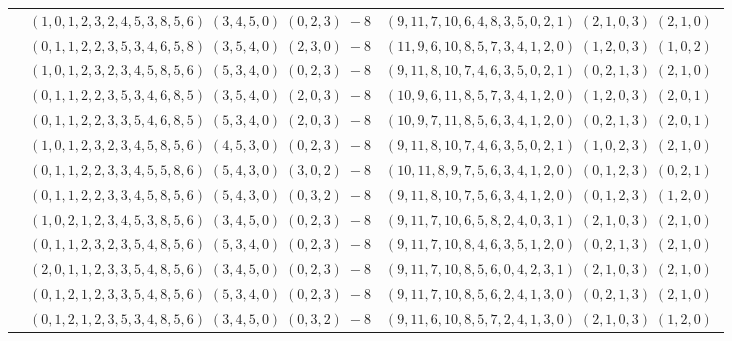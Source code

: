 \documentclass[11pt]{article}
\begin{document}
\begin{longtable}[l]{|c|c|c|}
 \cline{2-3} 
 & $(1 ,0 ,1 ,2 ,3 ,2 ,4 ,5 ,3 ,8 ,5 ,6) \;(3 ,4 ,5 ,0) \;(0 ,2 ,3) \;-8$ & $(9 ,11 ,7 ,10 ,6 ,4 ,8 ,3 ,5 ,0 ,2 ,1) \;(2 ,1 ,0 ,3) \;(2 ,1 ,0) \;$\\ 
 \cline{2-3} 
 & $(0 ,1 ,1 ,2 ,2 ,3 ,5 ,3 ,4 ,6 ,5 ,8) \;(3 ,5 ,4 ,0) \;(2 ,3 ,0) \;-8$ & $(11 ,9 ,6 ,10 ,8 ,5 ,7 ,3 ,4 ,1 ,2 ,0) \;(1 ,2 ,0 ,3) \;(1 ,0 ,2) \;$\\ 
 \cline{2-3} 
 & $(1 ,0 ,1 ,2 ,3 ,2 ,3 ,4 ,5 ,8 ,5 ,6) \;(5 ,3 ,4 ,0) \;(0 ,2 ,3) \;-8$ & $(9 ,11 ,8 ,10 ,7 ,4 ,6 ,3 ,5 ,0 ,2 ,1) \;(0 ,2 ,1 ,3) \;(2 ,1 ,0) \;$\\ 
 \cline{2-3} 
 & $(0 ,1 ,1 ,2 ,2 ,3 ,5 ,3 ,4 ,6 ,8 ,5) \;(3 ,5 ,4 ,0) \;(2 ,0 ,3) \;-8$ & $(10 ,9 ,6 ,11 ,8 ,5 ,7 ,3 ,4 ,1 ,2 ,0) \;(1 ,2 ,0 ,3) \;(2 ,0 ,1) \;$\\ 
 \cline{2-3} 
 & $(0 ,1 ,1 ,2 ,2 ,3 ,3 ,5 ,4 ,6 ,8 ,5) \;(5 ,3 ,4 ,0) \;(2 ,0 ,3) \;-8$ & $(10 ,9 ,7 ,11 ,8 ,5 ,6 ,3 ,4 ,1 ,2 ,0) \;(0 ,2 ,1 ,3) \;(2 ,0 ,1) \;$\\ 
 \cline{2-3} 
 & $(1 ,0 ,1 ,2 ,3 ,2 ,3 ,4 ,5 ,8 ,5 ,6) \;(4 ,5 ,3 ,0) \;(0 ,2 ,3) \;-8$ & $(9 ,11 ,8 ,10 ,7 ,4 ,6 ,3 ,5 ,0 ,2 ,1) \;(1 ,0 ,2 ,3) \;(2 ,1 ,0) \;$\\ 
 \cline{2-3} 
 & $(0 ,1 ,1 ,2 ,2 ,3 ,3 ,4 ,5 ,5 ,8 ,6) \;(5 ,4 ,3 ,0) \;(3 ,0 ,2) \;-8$ & $(10 ,11 ,8 ,9 ,7 ,5 ,6 ,3 ,4 ,1 ,2 ,0) \;(0 ,1 ,2 ,3) \;(0 ,2 ,1) \;$\\ 
 \cline{2-3} 
 & $(0 ,1 ,1 ,2 ,2 ,3 ,3 ,4 ,5 ,8 ,5 ,6) \;(5 ,4 ,3 ,0) \;(0 ,3 ,2) \;-8$ & $(9 ,11 ,8 ,10 ,7 ,5 ,6 ,3 ,4 ,1 ,2 ,0) \;(0 ,1 ,2 ,3) \;(1 ,2 ,0) \;$\\ 
 \cline{2-3} 
 & $(1 ,0 ,2 ,1 ,2 ,3 ,4 ,5 ,3 ,8 ,5 ,6) \;(3 ,4 ,5 ,0) \;(0 ,2 ,3) \;-8$ & $(9 ,11 ,7 ,10 ,6 ,5 ,8 ,2 ,4 ,0 ,3 ,1) \;(2 ,1 ,0 ,3) \;(2 ,1 ,0) \;$\\ 
 \cline{2-3} 
 & $(0 ,1 ,1 ,2 ,3 ,2 ,3 ,5 ,4 ,8 ,5 ,6) \;(5 ,3 ,4 ,0) \;(0 ,2 ,3) \;-8$ & $(9 ,11 ,7 ,10 ,8 ,4 ,6 ,3 ,5 ,1 ,2 ,0) \;(0 ,2 ,1 ,3) \;(2 ,1 ,0) \;$\\ 
 \cline{2-3} 
 & $(2 ,0 ,1 ,1 ,2 ,3 ,3 ,5 ,4 ,8 ,5 ,6) \;(3 ,4 ,5 ,0) \;(0 ,2 ,3) \;-8$ & $(9 ,11 ,7 ,10 ,8 ,5 ,6 ,0 ,4 ,2 ,3 ,1) \;(2 ,1 ,0 ,3) \;(2 ,1 ,0) \;$\\ 
 \cline{2-3} 
 & $(0 ,1 ,2 ,1 ,2 ,3 ,3 ,5 ,4 ,8 ,5 ,6) \;(5 ,3 ,4 ,0) \;(0 ,2 ,3) \;-8$ & $(9 ,11 ,7 ,10 ,8 ,5 ,6 ,2 ,4 ,1 ,3 ,0) \;(0 ,2 ,1 ,3) \;(2 ,1 ,0) \;$\\ 
 \cline{2-3} 
 & $(0 ,1 ,2 ,1 ,2 ,3 ,5 ,3 ,4 ,8 ,5 ,6) \;(3 ,4 ,5 ,0) \;(0 ,3 ,2) \;-8$ & $(9 ,11 ,6 ,10 ,8 ,5 ,7 ,2 ,4 ,1 ,3 ,0) \;(2 ,1 ,0 ,3) \;(1 ,2 ,0) \;$\\ 

\end{longtable}
\end{document}
